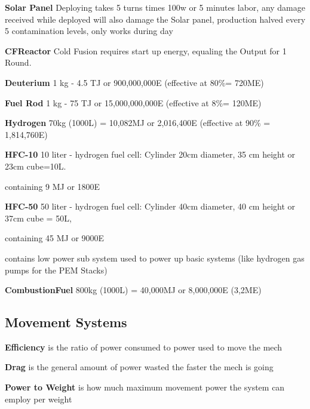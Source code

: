 \textbf {Solar Panel} Deploying takes 5 turns times 100w or 5 minutes labor, any damage received while deployed
will also damage the Solar panel, production halved every 5 contamination levels, only works during day

\textbf {CFReactor} Cold Fusion requires start up energy, equaling the Output for 1 Round.

\textbf {Deuterium} 1 kg - 4.5 TJ or 900,000,000E (effective at 80\%= 720ME)

\textbf {Fuel Rod} 1 kg - 75 TJ or 15,000,000,000E (effective at 8\%= 120ME)

\textbf {Hydrogen} 70kg (1000L) = 10,082MJ or 2,016,400E (effective at 90\% = 1,814,760E)

\textbf {HFC-10} 10 liter - hydrogen fuel cell: Cylinder 20cm diameter,
35 cm height or 23cm cube=10L. \par
containing 9 MJ or 1800E

\textbf {HFC-50} 50 liter - hydrogen fuel cell: Cylinder 40cm diameter,
40 cm height or 37cm cube = 50L,
\par containing 45 MJ or 9000E\par
contains low power sub system used to power up basic systems (like hydrogen gas pumps for the PEM Stacks)

\textbf{CombustionFuel} 800kg (1000L) = 40,000MJ or 8,000,000E (3,2ME)

\subsection{Movement Systems}\label{subsec:movementsystems}

\textbf{Efficiency} is the ratio of power consumed to power used to move the mech

\textbf{Drag} is the general amount of power wasted the faster the mech is going

\textbf{Power to Weight} is how much maximum movement power the system can employ per weight


